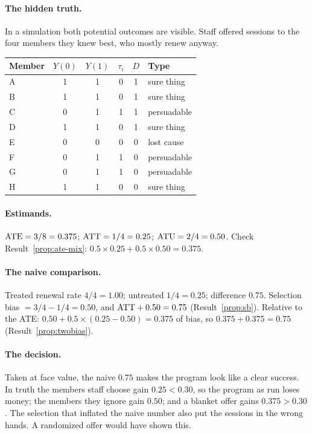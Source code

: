 \documentclass[11pt]{article}
\begin{document}
\paragraph{The hidden truth.} In a simulation both potential outcomes are visible. Staff offered sessions
to the four members they knew best, who mostly renew anyway.
\begin{center}
\begin{tabular}{lccccl}
\toprule
Member & $Y(0)$ & $Y(1)$ & $\tau_i$ & $D$ & Type \\
\midrule
A & 1 & 1 & 0 & 1 & sure thing \\
B & 1 & 1 & 0 & 1 & sure thing \\
C & 0 & 1 & 1 & 1 & persuadable \\
D & 1 & 1 & 0 & 1 & sure thing \\
E & 0 & 0 & 0 & 0 & lost cause \\
F & 0 & 1 & 1 & 0 & persuadable \\
G & 0 & 1 & 1 & 0 & persuadable \\
H & 1 & 1 & 0 & 0 & sure thing \\
\bottomrule
\end{tabular}
\end{center}

\paragraph{Estimands.} $\text{ATE} = 3/8 = 0.375$; $\text{ATT} = 1/4 = 0.25$; $\text{ATU} = 2/4 = 0.50$. Check
Result~\ref{prop:ate-mix}: $0.5 \times 0.25 + 0.5 \times 0.50 = 0.375$.

\paragraph{The naive comparison.} Treated renewal rate $4/4 = 1.00$; untreated $1/4 = 0.25$; difference
$0.75$. Selection bias $= 3/4 - 1/4 = 0.50$, and $\text{ATT} + 0.50 = 0.75$ (Result~\ref{prop:sb}). Relative to
the ATE: $0.50 + 0.5 \times (0.25 - 0.50) = 0.375$ of bias, so $0.375 + 0.375 = 0.75$
(Result~\ref{prop:twobias}).

\paragraph{The decision.} Taken at face value, the naive $0.75$ makes the program look like a clear success.
In truth the members staff choose gain $0.25 < 0.30$, so the program as run loses money; the members they
ignore gain $0.50$; and a blanket offer gains $0.375 > 0.30$. The selection that inflated the naive number also put the sessions in
the wrong hands. A randomized offer would have shown this.
\end{document}
